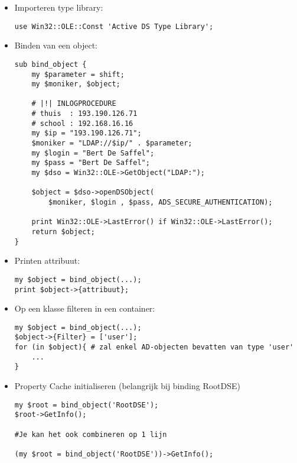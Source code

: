 \documentclass{report}
\begin{document}
\lstset{
    language=perl
}

\begin{itemize}
    \item[\info] Importeren type library:
    \begin{lstlisting}
use Win32::OLE::Const 'Active DS Type Library';
    \end{lstlisting}
    \item[\info] Binden van een object:
    \begin{lstlisting}
sub bind_object {
    my $parameter = shift;
    my $moniker, $object;

    # |!| INLOGPROCEDURE    
    # thuis  : 193.190.126.71
    # school : 192.168.16.16
    my $ip = "193.190.126.71";
    $moniker = "LDAP://$ip/" . $parameter; 
    my $login = "Bert De Saffel";
    my $pass = "Bert De Saffel";
    my $dso = Win32::OLE->GetObject("LDAP:");

    $object = $dso->openDSObject(
        $moniker, $login , $pass, ADS_SECURE_AUTHENTICATION);

    print Win32::OLE->LastError() if Win32::OLE->LastError();
    return $object;
}

    \end{lstlisting}

    \item[\info] Printen attribuut:
    \begin{lstlisting}
my $object = bind_object(...);
print $object->{attribuut};
    \end{lstlisting}

    \item[\info] Op een klasse filteren in een container:
    \begin{lstlisting}
my $object = bind_object(...);
$object->{Filter} = ['user'];
for (in $object){ # zal enkel AD-objecten bevatten van type 'user'
    ...
}
    \end{lstlisting}

    \item[\info] Property Cache initialiseren (belangrijk bij binding RootDSE)
    \begin{lstlisting}
my $root = bind_object('RootDSE');
$root->GetInfo();

#Je kan het ook combineren op 1 lijn

(my $root = bind_object('RootDSE'))->GetInfo();
    \end{lstlisting}


\end{itemize}
\end{document}
